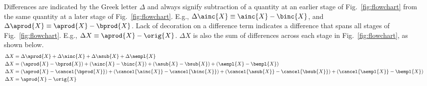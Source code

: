 Differences are indicated by the Greek letter $\Delta$ and always
signify subtraction of a quantity at an earlier stage of Fig.~\ref{fig:flowchart}
from the same quantity at a later stage of Fig.~\ref{fig:flowchart}.
E.g.,
$\Delta \ainc{X} \equiv \ainc{X} - \binc{X}$, and
$\Delta \aprod{X} \equiv \aprod{X} - \bprod{X}$.
Lack of decoration on a difference term indicates a difference that spans all stages of Fig.~\ref{fig:flowchart}.
E.g., $\Delta X \equiv \aprod{X} - \orig{X}$.
$\Delta X$ is also the sum of differences across each stage in Fig.~\ref{fig:flowchart},
as shown below.
%
\begin{align}
\Delta X &= \Delta \aprod{X} + \Delta \ainc{X} + \Delta \asub{X} + \Delta \aempl{X} \nonumber \\
\Delta X &= (\aprod{X} - \bprod{X}) + (\ainc{X} - \binc{X})
            + (\asub{X} - \bsub{X}) + (\aempl{X} - \bempl{X}) \nonumber \\
\Delta X &= (\aprod{X} - \cancel{\bprod{X}}) + (\cancel{\ainc{X}} - \cancel{\binc{X}})
            + (\cancel{\asub{X}} - \cancel{\bsub{X}}) + (\cancel{\aempl{X}} - \bempl{X}) \nonumber \\
\Delta X &= \aprod{X} - \orig{X}
\end{align}
